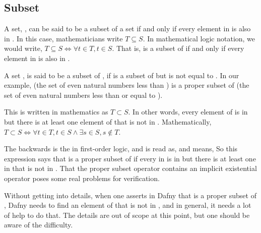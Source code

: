 \documentclass[letterpaper,10pt,english]{sphinxmanual}
\begin{document}
\subsection{Subset}
\label{\detokenize{07-set-theory:subset}}
A set, , can be said to be a subset of a set  if and only if
every element in  is also in . In this case, mathematicians
write \(T \subseteq S\). In mathematical logic notation, we would
write, \(T \subseteq S \iff \forall t \in T, t \in S\). That is,
 is a subset of  if and only if every element in  is also in
.

A set , is said to be a  subset of , if  is a subset
of  but  is not equal to . In our example,  (the set of
even natural numbers less than ) is a proper subset of  (the
set of even natural numbers less than or equal to ).

This is written in mathematics as \(T \subset S\). In other words,
every element of  is in  but there is at least one element of
 that is not in . Mathematically, \(T \subset S \iff
\forall t \in T, t \in S \land \exists s \in S, s \notin T\).

The backwards  is the  in first-order
logic, and is read as, and means,  So this expression
says that  is a proper subset of  if every  in  is in 
but there is at least one  in  that is not in . That the
proper subset operator contains an implicit existential operator poses
some real problems for verification.

Without getting into details, when one asserts in Dafny that  is a
proper subset of , Dafny needs to find an element of  that is
not in , and in general, it needs a lot of help to do that. The
details are out of scope at this point, but one should be aware of the
difficulty.
\end{document}
